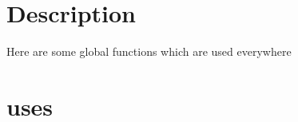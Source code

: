 \documentclass{report}
\begin{document}
\section{Description}
Here are some global functions which are used everywhere
\section{uses}
\begin{itemize}
\item \begin{ttfamily}Classes\end{ttfamily}\item \begin{ttfamily}SysUtils\end{ttfamily}\item \begin{ttfami
\end{itemize}
\end{document}
